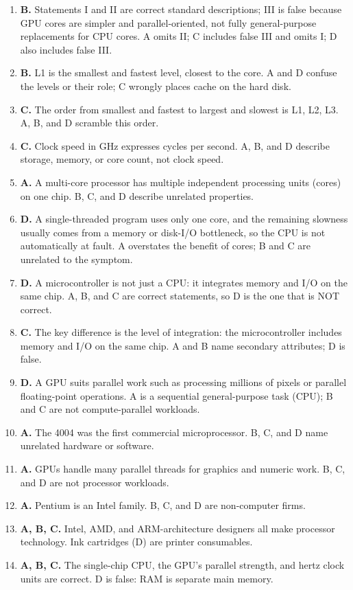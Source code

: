 \documentclass[11pt]{article}
\begin{document}
\begin{enumerate}[label=\textbf{Q\arabic*.}, leftmargin=*]
\item \textbf{B.} Statements I and II are correct standard descriptions; III
  is false because GPU cores are simpler and parallel-oriented, not fully
  general-purpose replacements for CPU cores. A omits II; C includes false
  III and omits I; D also includes false III.
\item \textbf{B.} L1 is the smallest and fastest level, closest to the core. A
  and D confuse the levels or their role; C wrongly places cache on the hard
  disk.
\item \textbf{C.} The order from smallest and fastest to largest and slowest is
  L1, L2, L3. A, B, and D scramble this order.
\item \textbf{C.} Clock speed in GHz expresses cycles per second. A, B, and D
  describe storage, memory, or core count, not clock speed.
\item \textbf{A.} A multi-core processor has multiple independent processing
  units (cores) on one chip. B, C, and D describe unrelated properties.
\item \textbf{D.} A single-threaded program uses only one core, and the
  remaining slowness usually comes from a memory or disk-I/O bottleneck, so
  the CPU is not automatically at fault. A overstates the benefit of cores; B
  and C are unrelated to the symptom.
\item \textbf{D.} A microcontroller is not just a CPU: it integrates memory and
  I/O on the same chip. A, B, and C are correct statements, so D is the one
  that is NOT correct.
\item \textbf{C.} The key difference is the level of integration: the
  microcontroller includes memory and I/O on the same chip. A and B name
  secondary attributes; D is false.
\item \textbf{D.} A GPU suits parallel work such as processing millions of
  pixels or parallel floating-point operations. A is a sequential
  general-purpose task (CPU); B and C are not compute-parallel workloads.

\item \textbf{A.} The 4004 was the first commercial microprocessor. B, C, and D name unrelated hardware or software.
\item \textbf{A.} GPUs handle many parallel threads for graphics and numeric work. B, C, and D are not processor workloads.
\item \textbf{A.} Pentium is an Intel family. B, C, and D are non-computer firms.
\item \textbf{A, B, C.} Intel, AMD, and ARM-architecture designers all make processor technology. Ink cartridges (D) are printer consumables.
\item \textbf{A, B, C.} The single-chip CPU, the GPU's parallel strength, and hertz clock units are correct. D is false: RAM is separate main memory.
\end{enumerate}
\def\JKSSBLessonID{6}\def\JKSSBAnswers{1}
\end{document}
